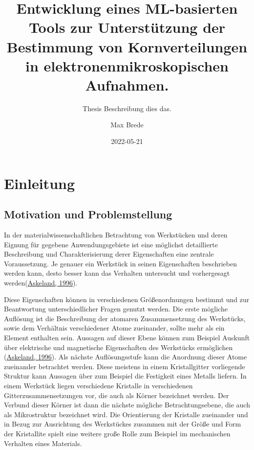 \documentclass[
  12pt,
]{book}
\title{Entwicklung eines ML-basierten Tools zur Unterstützung der Bestimmung von Kornverteilungen in elektronenmikroskopischen Aufnahmen.}
\subtitle{Thesis Beschreibung dies das.}
\author{Max Brede}
\date{2022-05-21}
\begin{document}
\maketitle

\renewcommand*\contentsname{Inhalt}
{
\setcounter{tocdepth}{1}
\tableofcontents
}
\listoffigures
\listoftables
{}
\hypertarget{einleitung}{%
\chapter{Einleitung}\label{einleitung}}

\hypertarget{motivation-und-problemstellung}{%
\section{Motivation und Problemstellung}\label{motivation-und-problemstellung}}

In der materialwissenschaftlichen Betrachtung von Werkstücken und deren Eignung für gegebene Anwendungsgebiete ist eine möglichst detaillierte Beschreibung und Charakterisierung derer Eigenschaften eine zentrale Voraussetzung. Je genauer ein Werkstück in seinen Eigenschaften beschrieben werden kann, desto besser kann das Verhalten untersucht und vorhergesagt werden(\protect\hyperlink{ref-askelandMaterialwissenschaftenGrundlagenUbungen1996}{Askeland, 1996}).

Diese Eigenschaften können in verschiedenen Größenordnungen bestimmt und zur Beantwortung unterschiedlicher Fragen genutzt werden.
Die erste mögliche Auflösung ist die Beschreibung der atomaren Zusammensetzung des Werkstücks, sowie dem Verhältnis verschiedener Atome zueinander, sollte mehr als ein Element enthalten sein. Aussagen auf dieser Ebene können zum Beispiel Auskunft über elektrische und magnetische Eigenschaften des Werkstücks ermöglichen (\protect\hyperlink{ref-askelandMaterialwissenschaftenGrundlagenUbungen1996}{Askeland, 1996}).
Als nächste Auflösungsstufe kann die Anordnung dieser Atome zueinander betrachtet werden. Diese meistens in einem Kristallgitter vorliegende Struktur kann Aussagen über zum Beispiel die Festigkeit eines Metalls liefern.
In einem Werkstück liegen verschiedene Kristalle in verschiedenen Gitterzusammensetzungen vor, die auch als Körner bezeichnet werden.
Der Verbund dieser Körner ist dann die nächste mögliche Betrachtungsebene, die auch als Mikrostruktur bezeichnet wird. Die Orientierung der Kristalle zueinander und in Bezug zur Ausrichtung des Werkstückes zusammen mit der Größe und Form der Kristallite spielt eine weitere große Rolle zum Beispiel im mechanischen Verhalten eines Materials.
\end{document}
